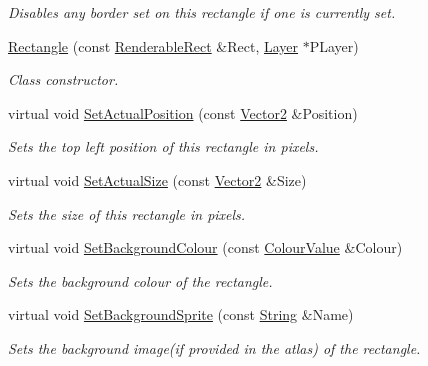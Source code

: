 \begin{DoxyCompactItemize}
\begin{DoxyCompactList}\small\item\em Disables any border set on this rectangle if one is currently set. \item\end{DoxyCompactList}\item 
\hyperlink{classMezzanine_1_1UI_1_1Rectangle_a2048370186db33f608584c9a33de71a1}{Rectangle} (const \hyperlink{structMezzanine_1_1UI_1_1RenderableRect}{RenderableRect} \&Rect, \hyperlink{classMezzanine_1_1UI_1_1Layer}{Layer} $\ast$PLayer)
\begin{DoxyCompactList}\small\item\em Class constructor. \item\end{DoxyCompactList}\item 
virtual void \hyperlink{classMezzanine_1_1UI_1_1Rectangle_ae0fa331126efedd6517a0a7775bdbbcb}{SetActualPosition} (const \hyperlink{classMezzanine_1_1Vector2}{Vector2} \&Position)
\begin{DoxyCompactList}\small\item\em Sets the top left position of this rectangle in pixels. \item\end{DoxyCompactList}\item 
virtual void \hyperlink{classMezzanine_1_1UI_1_1Rectangle_afa29e6cc6d4a180d2b4a718a237aa274}{SetActualSize} (const \hyperlink{classMezzanine_1_1Vector2}{Vector2} \&Size)
\begin{DoxyCompactList}\small\item\em Sets the size of this rectangle in pixels. \item\end{DoxyCompactList}\item 
virtual void \hyperlink{classMezzanine_1_1UI_1_1Rectangle_a11a3444ba78ad8c8f6303ccc73543c4b}{SetBackgroundColour} (const \hyperlink{classMezzanine_1_1ColourValue}{ColourValue} \&Colour)
\begin{DoxyCompactList}\small\item\em Sets the background colour of the rectangle. \item\end{DoxyCompactList}\item 
virtual void \hyperlink{classMezzanine_1_1UI_1_1Rectangle_ada0a67a6718ce99a2e869ecb81ddcf35}{SetBackgroundSprite} (const \hyperlink{namespaceMezzanine_acf9fcc130e6ebf08e3d8491aebcf1c86}{String} \&Name)
\begin{DoxyCompactList}\small\item\em Sets the background image(if provided in the atlas) of the rectangle. \item\end{DoxyCompactList}\item 

\end{DoxyCompactItemize}

